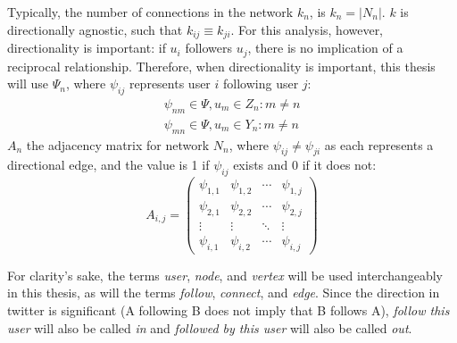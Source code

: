 \documentclass[preprint,review,12pt]{elsarticle}
\begin{document}
Typically, the number of connections in the network $k_n$, is $k_n = |N_n|$. $k$ is directionally agnostic, such that $k_{ij} \equiv k_{ji}$. For this analysis, however, directionality is important: if $u_i$ followers $u_j$, there is no implication of a reciprocal relationship. Therefore, when directionality is important, this thesis will use $\Psi_n$, where $\psi_{ij}$ represents user $i$ following user $j$:
    \begin{equation}
    \begin{split}
    \label{Psi Equation}
        \psi_{nm} \in \Psi, u_m \in Z_n: m \neq n \\
        \psi_{mn} \in \Psi, u_m \in Y_n: m \neq n 
    \end{split}
    \end{equation}
$A_n$ the adjacency matrix for network $N_n$, where $\psi_{ij} \neq \psi_{ji}$ as each represents a directional edge, and the value is 1 if $\psi_{ij}$ exists and 0 if it does not:
    \begin{equation*}
    \label{adjacencey matrix}
A_{i,j} = 
\begin{pmatrix}
\psi_{1,1} & \psi_{1,2} & \cdots & \psi_{1,j} \\
\psi_{2,1} & \psi_{2,2} & \cdots & \psi_{2,j} \\
\vdots  & \vdots  & \ddots & \vdots  \\
\psi_{i,1} & \psi_{i,2} & \cdots & \psi_{i,j} 
\end{pmatrix}
\end{equation*}
    

For clarity's sake, the terms \textit{user}, \textit{node}, and \textit{vertex} will be used interchangeably in this thesis, as will the terms \textit{follow}, \textit{connect}, and \textit{edge}. Since the direction in twitter is significant (A following B does not imply that B follows A), \textit{follow this user} will also be called \textit{in} and \textit{followed by this user} will also be called \textit{out}.
\end{document}

